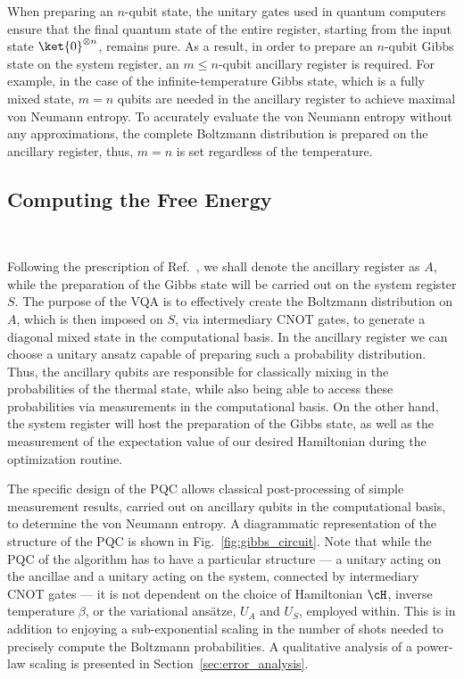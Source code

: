 When preparing an $n$-qubit state, the unitary gates used in quantum
computers ensure that the final quantum state of the entire register,
starting from the input state $\ket{0}^{\otimes n}$, remains pure. As
a result, in order to prepare an $n$-qubit Gibbs state on the system
register, an $m \leq n$-qubit ancillary register is required. For
example, in the case of the infinite-temperature Gibbs state, which is
a fully mixed state, $m = n$ qubits are needed in the ancillary
register to achieve maximal von Neumann entropy. To accurately
evaluate the von Neumann entropy without any approximations, the
complete Boltzmann distribution is prepared on the ancillary register,
thus, $m = n$ is set regardless of the temperature.

\subsection{Computing the Free Energy}~\label{sec:free_energy}

Following the prescription of Ref.~\cite{Consiglio2023}, we shall
denote the ancillary register as $A$, while the preparation of the
Gibbs state will be carried out on the system register $S$. The
purpose of the \ac{VQA} is to effectively create the Boltzmann
distribution on $A$, which is then imposed on $S$, via intermediary
\textsc{CNOT} gates, to generate a diagonal mixed state in the
computational basis. In the ancillary register we can choose a unitary
ansatz capable of preparing such a probability distribution. Thus, the
ancillary qubits are responsible for classically mixing in the
probabilities of the thermal state, while also being able to access
these probabilities via measurements in the computational basis. On
the other hand, the system register will host the preparation of the
Gibbs state, as well as the measurement of the expectation value of
our desired Hamiltonian during the optimization routine.

The specific design of the \ac{PQC} allows classical post-processing
of simple measurement results, carried out on ancillary qubits in the
computational basis, to determine the von Neumann entropy. A
diagrammatic representation of the structure of the \ac{PQC} is shown
in Fig.~\ref{fig:gibbs_circuit}. Note that while the \ac{PQC} of the
algorithm has to have a particular structure --- a unitary acting on
the ancillae and a unitary acting on the system, connected by
intermediary \textsc{CNOT} gates --- it is not dependent on the choice
of Hamiltonian $\cH$, inverse temperature $\beta$, or the variational
ans\"atze, $U_A$ and $U_S$, employed within. This is in addition to
enjoying a sub-exponential scaling in the number of shots needed to
precisely compute the Boltzmann probabilities. A qualitative analysis
of a power-law scaling is presented in
Section~\ref{sec:error_analysis}.

